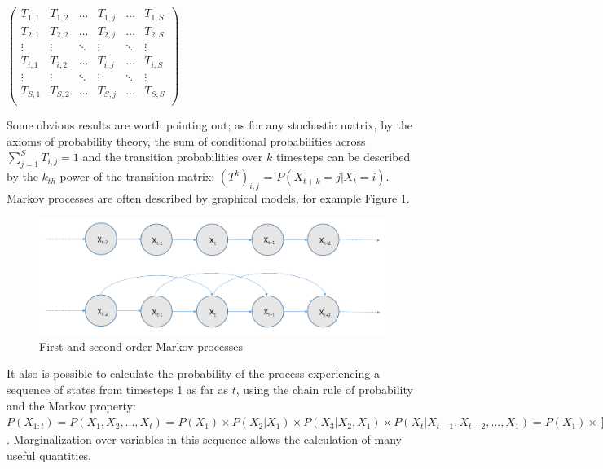 \begin{center}
{$\displaystyle \left({\begin{matrix}T_{1,1}&T_{1,2}&\dots &T_{1,j}&\dots &T_{1,S}\\T_{2,1}&T_{2,2}&\dots &T_{2,j}&\dots &T_{2,S}\\\vdots &\vdots &\ddots &\vdots &\ddots &\vdots \\T_{i,1}&T_{i,2}&\dots &T_{i,j}&\dots &T_{i,S}\\\vdots &\vdots &\ddots &\vdots &\ddots &\vdots \\T_{S,1}&T_{S,2}&\dots &T_{S,j}&\dots &T_{S,S}\\\end{matrix}}\right)$}
\end{center}
\par

Some obvious results are worth pointing out; as for any stochastic matrix, by the axioms of probability theory, the sum of conditional probabilities across {$\displaystyle \sum _{j=1}^{S}T_{i,j}=1$} and the transition probabilities over $k$ timesteps can be described by the $k_{th}$ power of the transition matrix: ${(T^k)}_{i,j}$ = $P(X_{t+k} = j | X_{t} = i)$. Markov processes are often described by graphical models, for example Figure \ref{fig:markov-processes}.
\begin{figure}[b!]
    \centering
    \includegraphics[width=0.8\linewidth]{Chapters/BackgroundKnowledgeAndRelatedWork/MultiAgentTargetDetectionBackground/Figs/MarkovProcesses/MarkovProcesses.png}
    \caption{First and second order Markov processes \cite{AIAMA}}
    \label{fig:markov-processes}
\end{figure}
It also is possible to calculate the probability of the process experiencing a sequence of states from timesteps 1 as far as $t$, using the chain rule of probability and the Markov property:
$P(X_{1:t}) = P(X_1, X_2, ..., X_t) = P(X_1)\times P(X_2 | X_1)\times P(X_3 | X_2, X_1) \times P(X_t | X_{t-1}, X_{t-2}, ... , X_1) = P(X_1) \times \prod_{i=2}^{t}{P(X_i | x_{i-1})}$. Marginalization over variables in this sequence allows the calculation of many useful quantities.
\par

